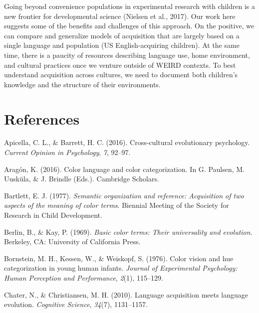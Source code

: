 \documentclass[
  english,
  ,man,floatsintext]{apa6}
\begin{document}
Going beyond convenience populations in experimental research with children is a new frontier for developmental science (Nielsen et al., 2017). Our work here suggests some of the benefits and challenges of this approach. On the positive, we can compare and generalize models of acquisition that are largely based on a single language and population (US English-acquiring children). At the same time, there is a paucity of resources describing language use, home environment, and cultural practices once we venture outside of WEIRD contexts. To best understand acquisition across cultures, we need to document both children's knowledge and the structure of their environments.

\newpage

\hypertarget{references}{%
\section{References}\label{references}}

\begingroup
\setlength{\parindent}{-0.5in}
\setlength{\leftskip}{0.5in}

\hypertarget{refs}{}
\leavevmode\hypertarget{ref-apicella2016}{}%
Apicella, C. L., \& Barrett, H. C. (2016). Cross-cultural evolutionary psychology. \emph{Current Opinion in Psychology}, \emph{7}, 92--97.

\leavevmode\hypertarget{ref-aragon2016}{}%
Aragón, K. (2016). Color language and color categorization. In G. Paulsen, M. Uusküla, \& J. Brindle (Eds.). Cambridge Scholars.

\leavevmode\hypertarget{ref-bartlett1977}{}%
Bartlett, E. J. (1977). \emph{Semantic organization and reference: Acquisition of two aspects of the meaning of color terms}. Biennial Meeting of the Society for Research in Child Development.

\leavevmode\hypertarget{ref-berlin1969}{}%
Berlin, B., \& Kay, P. (1969). \emph{Basic color terms: Their universality and evolution}. Berkeley, CA: University of California Press.

\leavevmode\hypertarget{ref-bornstein1976}{}%
Bornstein, M. H., Kessen, W., \& Weiskopf, S. (1976). Color vision and hue categorization in young human infants. \emph{Journal of Experimental Psychology: Human Perception and Performance}, \emph{2}(1), 115--129.

\leavevmode\hypertarget{ref-chater2010}{}%
Chater, N., \& Christiansen, M. H. (2010). Language acquisition meets language evolution. \emph{Cognitive Science}, \emph{34}(7), 1131--1157.
\end{document}
